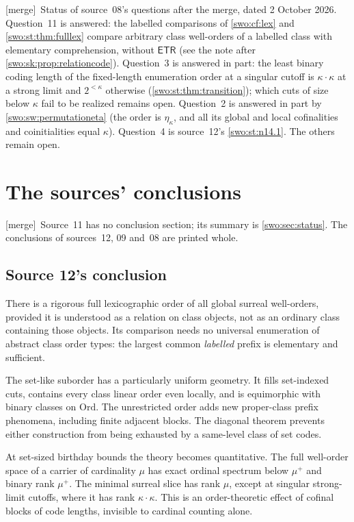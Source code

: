 \documentclass[11pt]{article}
\theoremstyle{definition}
\theoremstyle{remark}
\newcommand{\Ord}{\mathrm{Ord}}
\newcommand{\ETR}{\mathsf{ETR}}
\newcommand{\merge}{\textsf{[merge]}}
\begin{document}

\merge\ Status of source~08's questions after the merge, dated 2 October 2026.
Question~11 is answered: the labelled comparisons of \cref{swo:cf:lex} and
\cref{swo:st:thm:fulllex} compare arbitrary class well-orders of a labelled
class with elementary comprehension, without $\ETR$ (see the note after
\cref{swo:sk:prop:relationcode}). Question~3 is answered in part: the least
binary coding length of the fixed-length enumeration order at a singular
cutoff is $\kappa\cdot\kappa$ at a strong limit and $2^{<\kappa}$ otherwise
(\cref{swo:st:thm:transition}); which cuts of size below $\kappa$ fail to be
realized remains open. Question~2 is answered in part by
\cref{swo:sw:permutationeta} (the order is $\eta_\kappa$, and all its global
and local cofinalities and coinitialities equal $\kappa$). Question~4 is
source~12's \cref{swo:st:n14.1}. The others remain open.

\section{The sources' conclusions}\label{swo:sec:conclusions}

\merge\ Source~11 has no conclusion section; its summary is
\cref{swo:sec:status}. The conclusions of sources~12, 09 and~08 are printed
whole.

\subsection{Source 12's conclusion}

There is a rigorous full lexicographic order of all global surreal
well-orders, provided it is understood as a relation on class objects,
not as an ordinary class containing those objects. Its comparison needs
no universal enumeration of abstract class order types: the largest
common \emph{labelled} prefix is elementary and sufficient.

The set-like suborder has a particularly uniform geometry. It fills
set-indexed cuts, contains every class linear order even locally, and is
equimorphic with binary classes on $\Ord$. The unrestricted order adds
new proper-class prefix phenomena, including finite adjacent blocks.
The diagonal theorem prevents either construction from being exhausted
by a same-level class of set codes.

At set-sized birthday bounds the theory becomes quantitative. The full
well-order space of a carrier of cardinality $\mu$ has exact ordinal
spectrum below $\mu^+$ and binary rank $\mu^+$. The minimal surreal slice
has rank $\mu$, except at singular strong-limit cutoffs, where it has
rank $\kappa\cdot\kappa$. This is an order-theoretic effect of cofinal
blocks of code lengths, invisible to cardinal counting alone.
\end{document}
